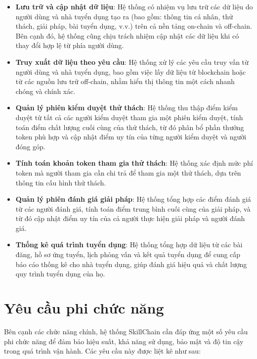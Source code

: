 \begin{itemize}
  \item \textbf{Lưu trữ và cập nhật dữ liệu}: Hệ thống có nhiệm vụ lưu trữ các dữ liệu do người dùng và nhà tuyển dụng tạo ra (bao gồm: thông tin cá nhân, thử thách, giải pháp, bài tuyển dụng, v.v.) trên cả nền tảng on-chain và off-chain. Bên cạnh đó, hệ thống cũng chịu trách nhiệm cập nhật các dữ liệu khi có thay đổi hợp lệ từ phía người dùng.
  \item \textbf{Truy xuất dữ liệu theo yêu cầu}: Hệ thống xử lý các yêu cầu truy vấn từ người dùng và nhà tuyển dụng, bao gồm việc lấy dữ liệu từ blockchain hoặc từ các nguồn lưu trữ off-chain, nhằm hiển thị thông tin một cách nhanh chóng và chính xác.
  \item \textbf{Quản lý phiên kiểm duyệt thử thách}: Hệ thống thu thập điểm kiểm duyệt từ tất cả các người kiểm duyệt tham gia một phiên kiểm duyệt, tính toán điểm chất lượng cuối cùng của thử thách, từ đó phân bổ phần thưởng token phù hợp và cập nhật điểm uy tín của từng người kiểm duyệt và người đóng góp.
  \item \textbf{Tính toán khoản token tham gia thử thách}: Hệ thống xác định mức phí token mà người tham gia cần chi trả để tham gia một thử thách, dựa trên thông tin cấu hình thử thách.
  \item \textbf{Quản lý phiên đánh giá giải pháp}: Hệ thống tổng hợp các điểm đánh giá từ các người đánh giá, tính toán điểm trung bình cuối cùng của giải pháp, và từ đó cập nhật điểm uy tín của cả người thực hiện giải pháp và người đánh giá.
  \item \textbf{Thống kê quá trình tuyển dụng}: Hệ thống tổng hợp dữ liệu từ các bài đăng, hồ sơ ứng tuyển, lịch phỏng vấn và kết quả tuyển dụng để cung cấp báo cáo thống kê cho nhà tuyển dụng, giúp đánh giá hiệu quả và chất lượng quy trình tuyển dụng của họ.
\end{itemize}

\section{Yêu cầu phi chức năng}

Bên cạnh các chức năng chính, hệ thống SkillChain cần đáp ứng một số yêu cầu phi chức năng để đảm bảo hiệu suất, khả năng sử dụng, bảo mật và độ tin cậy trong quá trình vận hành. Các yêu cầu này được liệt kê như sau:

